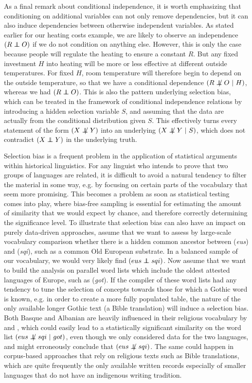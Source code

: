As a final remark about conditional independence, it is worth emphasizing that conditioning on additional variables can not only remove dependencies, but it can also induce dependencies between otherwise independent variables. As stated earlier for our heating costs example, we are likely to observe an independence $(R \independent O)$ if we do not condition on anything else. However, this is only the case because people will regulate the heating to ensure a constant $R$. But any fixed investment $H$ into heating will be more or less effective at different outside temperatures. For fixed $H$, room temperature will therefore begin to depend on the outside temperature, so that we have a conditional dependence $(R \notindep O\ |\ H)$, whereas we had $(R \independent O)$. This is also the pattern underlying selection bias, which can be treated in the framework of conditional independence relations by introducing a hidden selection variable $S$, and assuming that the data are actually from the conditional 
distribution given $S$. This effectively turns every statement of the form $(X \notindep Y)$ into an underlying $(X \notindep Y\ |\ S)$, which does not contradict $(X \independent Y)$ in the underlying truth. 

Selection bias is a frequent problem in the application of statistical arguments within historical linguistics. For any linguist who intends to prove that two groups of languages are related, it is difficult to avoid a natural tendency to filter the material in some way, e.g. by focusing on certain parts of the vocabulary that seem more promising. This becomes a problem as soon as statistical testing comes into play, where bias-free sampling is essential for estimating the amount of similarity that we would expect by chance, and therefore correctly determining the significance level. To illustrate that selection bias can also have an impact on purely data-driven approaches, assume that we want to assess by large-scale vocabulary comparison whether there is a hidden common ancestor between  (\textit{eus}) and  (\textit{sqi}), such as a common Old European substrate. In a balanced sample of our vocabulary, we would very likely find $(eus \independent sqi)$. Now assume that we want to build the analysis on parallel word lists which include the oldest attested languages of Europe, such as  (\textit{got}). If the compiler of these word lists had any tendency to tune the selection of concepts towards those for which a Gothic word is known, e.g. in order to create a more fully populated table, the nature of the only available longer Gothic text (a Bible translation) will induce a selection bias. Both Basque and Albanian are heavily influenced in their religious vocabulary by  and , which could easily lead to a statistically significant similarity on the word list $(eus \notindep sqi\ |\ got)$, even though we only considered data for the two languages, and might erroneously conclude that $(eus \notindep sqi)$. The same could happen in corpus-based approaches that rely on religious texts such as Bible translations, which are quite frequently the only available written records especially of smaller languages that do not have an indigenous writing tradition.

